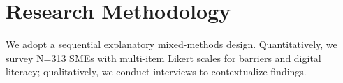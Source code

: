 \chapter{Research Methodology}
We adopt a sequential explanatory mixed-methods design. Quantitatively, we survey N=313 SMEs with multi-item Likert scales for barriers and digital literacy; qualitatively, we conduct interviews to contextualize findings.
